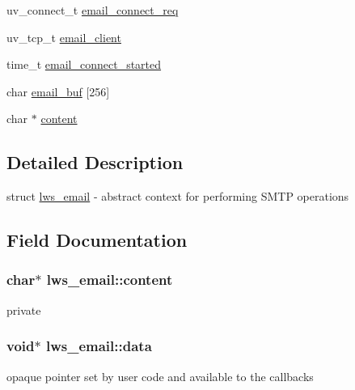 \begin{DoxyCompactItemize}
\item 
uv\+\_\+connect\+\_\+t \hyperlink{structlws__email_a5f53d4c5a1e34b0dcaa8787e2eabb1b3}{email\+\_\+connect\+\_\+req}
\item 
uv\+\_\+tcp\+\_\+t \hyperlink{structlws__email_a01f31934166dc6d01e8a375012f8ad1e}{email\+\_\+client}
\item 
time\+\_\+t \hyperlink{structlws__email_a9747ca85597788c2d118d287df47b7c1}{email\+\_\+connect\+\_\+started}
\item 
char \hyperlink{structlws__email_a8f34ec0643a817be67ef4276aeb7fb82}{email\+\_\+buf} \mbox{[}256\mbox{]}
\item 
char $\ast$ \hyperlink{structlws__email_a6fff03c5a5d369a2aa3cab0c897b1bed}{content}
\end{DoxyCompactItemize}


\subsection{Detailed Description}
struct \hyperlink{structlws__email}{lws\+\_\+email} -\/ abstract context for performing S\+M\+TP operations 

\subsection{Field Documentation}
\subsubsection[{\texorpdfstring{content}{content}}]{\setlength{\rightskip}{0pt plus 5cm}char$\ast$ lws\+\_\+email\+::content}\hypertarget{structlws__email_a6fff03c5a5d369a2aa3cab0c897b1bed}{}\label{structlws__email_a6fff03c5a5d369a2aa3cab0c897b1bed}
private 
\subsubsection[{\texorpdfstring{data}{data}}]{\setlength{\rightskip}{0pt plus 5cm}void$\ast$ lws\+\_\+email\+::data}\hypertarget{structlws__email_add1341456045382c183f4c763bdea6bc}{}\label{structlws__email_add1341456045382c183f4c763bdea6bc}
opaque pointer set by user code and available to the callbacks 
